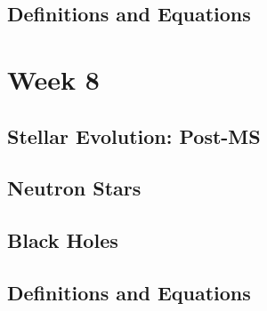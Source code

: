 \documentclass[a4paper,10pt]{article}
\begin{document}
\subsection{Definitions and Equations}

\newpage
\section{Week 8}

\subsection{Stellar Evolution: Post-MS}

\subsection{Neutron Stars}

\subsection{Black Holes}

\subsection{Definitions and Equations}
\end{document}
